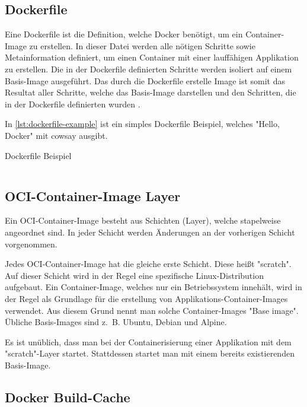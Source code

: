 \subsection{Dockerfile}

Eine Dockerfile ist die Definition, welche Docker benötigt, um ein Container-Image zu erstellen. In dieser Datei werden alle nötigen Schritte sowie Metainformation definiert, um einen Container mit einer lauffähigen Applikation zu erstellen. Die in der Dockerfile definierten Schritte werden isoliert auf einem Basis-Image ausgeführt. Das durch die Dockerfile erstelle Image ist somit das Resultat aller Schritte, welche das Basis-Image darstellen und den Schritten, die in der Dockerfile definierten wurden \cite{dockerDockerfileOverview}.

In \cref{lst:dockerfile-example} ist ein simples Dockerfile Beispiel, welches "Hello, Docker" mit cowsay ausgibt.

\begin{listing}[H]
    \caption{Dockerfile Beispiel}
    \label{lst:dockerfile-example}
    \inputminted{docker}{./code-examples/Dockerfile.example}
\end{listing}


\subsection{OCI-Container-Image Layer}

Ein OCI-Container-Image besteht aus Schichten (Layer), welche stapelweise angeordnet sind. In jeder Schicht werden Änderungen an der vorherigen Schicht vorgenommen. 

Jedes OCI-Container-Image hat die gleiche erste Schicht. Diese heißt "scratch". Auf dieser Schicht wird in der Regel eine spezifische Linux-Distribution aufgebaut. Ein Container-Image, welches nur ein Betriebssystem innehält, wird in der Regel als Grundlage für die erstellung von Applikations-Container-Images verwendet. Aus diesem Grund nennt man solche Container-Images "Base image". Übliche Basis-Images sind z. B. Ubuntu, Debian und Alpine. 

Es ist unüblich, dass man bei der Containerisierung einer Applikation mit dem "scratch"-Layer startet. Stattdessen startet man mit einem bereits existierenden Basis-Image.

\subsection{Docker Build-Cache} \label{sec:bg-docker-cache}

